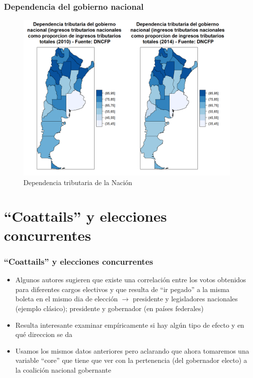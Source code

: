 \documentclass[a4paper,handout,mathserif,final,xcolor=dvipsnames,twocolumn]{beamer}
\begin{document}
  \begin{frame}\frametitle{Dependencia del gobierno nacional}
\begin{figure}[htbp]
    \centering \vspace{-0.5cm}
    \includegraphics[scale=0.375]{grafico5}
    \caption{Dependencia tributaria de la Nación}
    \label{fig:1}
  \end{figure}
    \end{frame}
  
    \section{``Coattails'' y elecciones concurrentes}

    \begin{frame}\frametitle{``Coattails'' y elecciones concurrentes}
  \begin{itemize}\itemsep 10pt
  \item Algunos autores sugieren que existe una correlación entre los
    votos obtenidos para diferentes cargos electivos y que resulta de
    ``ir pegado'' a la misma boleta en el mismo dia de elección
    $\longrightarrow$ presidente y legisladores nacionales (ejemplo
    clásico); presidente y gobernador (en países federales)
    \item Resulta interesante examinar empíricamente si hay algún tipo
      de efecto y en qué direccion se da
      \item Usamos los mismos datos anteriores pero aclarando que
        ahora tomaremos una variable ``core'' que tiene que ver con la
        pertenencia (del gobernador electo) a la coalición nacional gobernante 
    \end{itemize}
  \end{frame}
    
\end{document}
